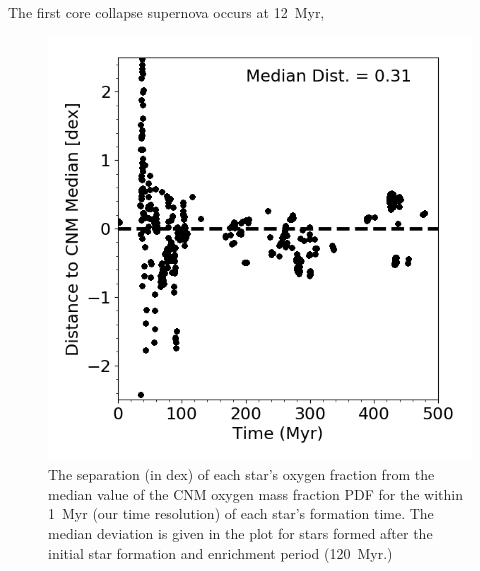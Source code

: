 \documentclass[twocolumn]{aastex61}
\begin{document}
The first core collapse supernova occurs at 12~Myr, 

\begin{figure}
\centering
\includegraphics[width=0.95\linewidth]{stellar_CNM_distance.png}
\caption{The separation (in dex) of each star's oxygen fraction from the median value of the CNM oxygen mass fraction PDF for the within 1~Myr (our time resolution) of each star's formation time. The median deviation is given in the plot for stars formed after the initial star formation and enrichment period (120~Myr.)}
\label{fig:stars}
\end{figure}
\end{document}
